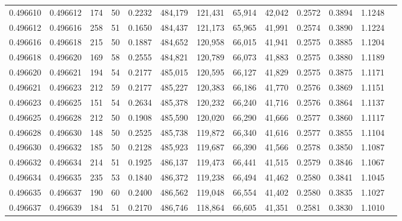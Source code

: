 \begin{tabular}{rrrrrrrrrrrrr}
0.496610 & 0.496612 &   174 &  50 &                                     0.2232 & 484,179 & 121,431 &  65,914 &  42,042 & 0.2572 & 0.3894 & 1.1248 \\
0.496612 & 0.496616 &   258 &  51 &                                     0.1650 & 484,437 & 121,173 &  65,965 &  41,991 & 0.2574 & 0.3890 & 1.1224 \\
0.496616 & 0.496618 &   215 &  50 &                                     0.1887 & 484,652 & 120,958 &  66,015 &  41,941 & 0.2575 & 0.3885 & 1.1204 \\
0.496618 & 0.496620 &   169 &  58 &                                     0.2555 & 484,821 & 120,789 &  66,073 &  41,883 & 0.2575 & 0.3880 & 1.1189 \\
0.496620 & 0.496621 &   194 &  54 &                                     0.2177 & 485,015 & 120,595 &  66,127 &  41,829 & 0.2575 & 0.3875 & 1.1171 \\
0.496621 & 0.496623 &   212 &  59 &                                     0.2177 & 485,227 & 120,383 &  66,186 &  41,770 & 0.2576 & 0.3869 & 1.1151 \\
0.496623 & 0.496625 &   151 &  54 &                                     0.2634 & 485,378 & 120,232 &  66,240 &  41,716 & 0.2576 & 0.3864 & 1.1137 \\
0.496625 & 0.496628 &   212 &  50 &                                     0.1908 & 485,590 & 120,020 &  66,290 &  41,666 & 0.2577 & 0.3860 & 1.1117 \\
0.496628 & 0.496630 &   148 &  50 &                                     0.2525 & 485,738 & 119,872 &  66,340 &  41,616 & 0.2577 & 0.3855 & 1.1104 \\
0.496630 & 0.496632 &   185 &  50 &                                     0.2128 & 485,923 & 119,687 &  66,390 &  41,566 & 0.2578 & 0.3850 & 1.1087 \\
0.496632 & 0.496634 &   214 &  51 &                                     0.1925 & 486,137 & 119,473 &  66,441 &  41,515 & 0.2579 & 0.3846 & 1.1067 \\
0.496634 & 0.496635 &   235 &  53 &                                     0.1840 & 486,372 & 119,238 &  66,494 &  41,462 & 0.2580 & 0.3841 & 1.1045 \\
0.496635 & 0.496637 &   190 &  60 &                                     0.2400 & 486,562 & 119,048 &  66,554 &  41,402 & 0.2580 & 0.3835 & 1.1027 \\
0.496637 & 0.496639 &   184 &  51 &                                     0.2170 & 486,746 & 118,864 &  66,605 &  41,351 & 0.2581 & 0.3830 & 1.1010 \\

\end{tabular}
